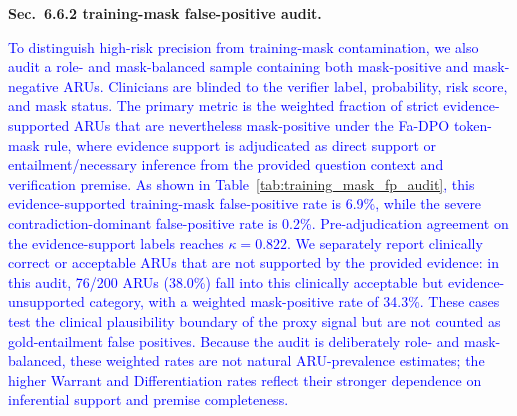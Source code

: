 \documentclass[12pt]{article}
\newcommand{\added}[1]{\textcolor{blue}{#1}}
\begin{document}
\textbf{Sec.~6.6.2 training-mask false-positive audit.}
\begin{displayquote}
\added{To distinguish high-risk precision from training-mask contamination, we also audit a role- and mask-balanced sample containing both mask-positive and mask-negative ARUs. Clinicians are blinded to the verifier label, probability, risk score, and mask status. The primary metric is the weighted fraction of strict evidence-supported ARUs that are nevertheless mask-positive under the Fa-DPO token-mask rule, where evidence support is adjudicated as direct support or entailment/necessary inference from the provided question context and verification premise. As shown in Table~\ref{tab:training_mask_fp_audit}, this evidence-supported training-mask false-positive rate is 6.9\%, while the severe contradiction-dominant false-positive rate is 0.2\%. Pre-adjudication agreement on the evidence-support labels reaches $\kappa=0.822$. We separately report clinically correct or acceptable ARUs that are not supported by the provided evidence: in this audit, 76/200 ARUs (38.0\%) fall into this clinically acceptable but evidence-unsupported category, with a weighted mask-positive rate of 34.3\%. These cases test the clinical plausibility boundary of the proxy signal but are not counted as gold-entailment false positives. Because the audit is deliberately role- and mask-balanced, these weighted rates are not natural ARU-prevalence estimates; the higher Warrant and Differentiation rates reflect their stronger dependence on inferential support and premise completeness.}


\end{displayquote}
\end{document}
